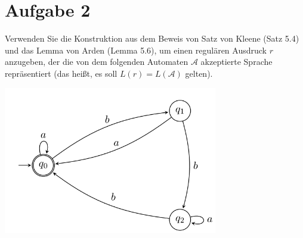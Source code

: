 \documentclass[12pt,a4paper]{article}
\newcommand{\A}{\mathcal{A}}
\begin{document}
\section*{Aufgabe 2}
Verwenden Sie die Konstruktion aus dem Beweis von Satz von Kleene (Satz 5.4) und das
Lemma von Arden (Lemma 5.6), um einen regulären Ausdruck $r$ anzugeben, der die von dem
folgenden Automaten $\A$ akzeptierte Sprache repräsentiert (das heißt, es soll $L(r) = L(\A)$ gelten).

\includegraphics[width=0.7\textwidth]{Blatt11_2.png}
 
\end{document}
